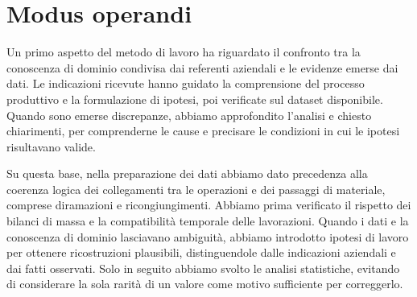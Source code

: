 \section{Modus operandi}
\label{sec:modus-operandi}

Un primo aspetto del metodo di lavoro ha riguardato il confronto tra la conoscenza di dominio condivisa dai referenti aziendali e le evidenze emerse dai dati. Le indicazioni ricevute hanno guidato la comprensione del processo produttivo e la formulazione di ipotesi, poi verificate sul dataset disponibile. Quando sono emerse discrepanze, abbiamo approfondito l'analisi e chiesto chiarimenti, per comprenderne le cause e precisare le condizioni in cui le ipotesi risultavano valide.

Su questa base, nella preparazione dei dati abbiamo dato precedenza alla coerenza logica dei collegamenti tra le operazioni e dei passaggi di materiale, comprese diramazioni e ricongiungimenti. Abbiamo prima verificato il rispetto dei bilanci di massa e la compatibilità temporale delle lavorazioni. Quando i dati e la conoscenza di dominio lasciavano ambiguità, abbiamo introdotto ipotesi di lavoro per ottenere ricostruzioni plausibili, distinguendole dalle indicazioni aziendali e dai fatti osservati. Solo in seguito abbiamo svolto le analisi statistiche, evitando di considerare la sola rarità di un valore come motivo sufficiente per correggerlo.
